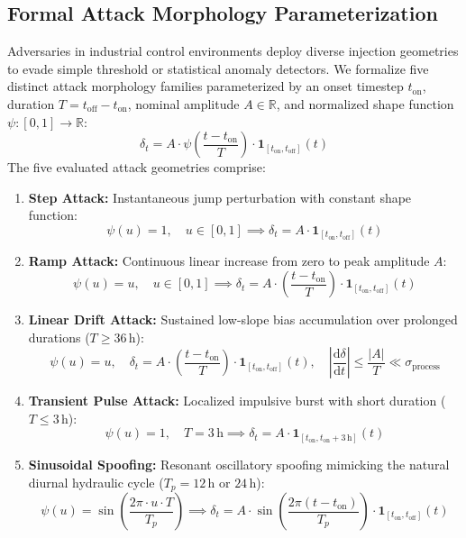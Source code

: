 \documentclass[11pt,a4paper]{article}
\begin{document}
\subsection{Formal Attack Morphology Parameterization}
Adversaries in industrial control environments deploy diverse injection geometries to evade simple threshold or statistical anomaly detectors. We formalize five distinct attack morphology families parameterized by an onset timestep $t_{\text{on}}$, duration $T = t_{\text{off}} - t_{\text{on}}$, nominal amplitude $A \in \mathbb{R}$, and normalized shape function $\psi: [0, 1] \to \mathbb{R}$:
\begin{equation}
\delta_t = A \cdot \psi\left(\frac{t - t_{\text{on}}}{T}\right) \cdot \mathbf{1}_{[t_{\text{on}}, t_{\text{off}}]}(t)
\end{equation}
The five evaluated attack geometries comprise:
\begin{enumerate}
    \item \textbf{Step Attack:} Instantaneous jump perturbation with constant shape function:
    \begin{equation}
    \psi(u) = 1, \quad u \in [0, 1] \implies \delta_t = A \cdot \mathbf{1}_{[t_{\text{on}}, t_{\text{off}}]}(t)
    \end{equation}
    \item \textbf{Ramp Attack:} Continuous linear increase from zero to peak amplitude $A$:
    \begin{equation}
    \psi(u) = u, \quad u \in [0, 1] \implies \delta_t = A \cdot \left(\frac{t - t_{\text{on}}}{T}\right) \cdot \mathbf{1}_{[t_{\text{on}}, t_{\text{off}}]}(t)
    \end{equation}
    \item \textbf{Linear Drift Attack:} Sustained low-slope bias accumulation over prolonged durations ($T \ge 36$\,h):
    \begin{equation}
    \psi(u) = u, \quad \delta_t = A \cdot \left(\frac{t - t_{\text{on}}}{T}\right) \cdot \mathbf{1}_{[t_{\text{on}}, t_{\text{off}}]}(t), \quad \left|\frac{\mathrm{d}\delta}{\mathrm{d}t}\right| \le \frac{|A|}{T} \ll \sigma_{\text{process}}
    \end{equation}
    \item \textbf{Transient Pulse Attack:} Localized impulsive burst with short duration ($T \le 3$\,h):
    \begin{equation}
    \psi(u) = 1, \quad T = 3\,\text{h} \implies \delta_t = A \cdot \mathbf{1}_{[t_{\text{on}}, t_{\text{on}}+3\,\text{h}]}(t)
    \end{equation}
    \item \textbf{Sinusoidal Spoofing:} Resonant oscillatory spoofing mimicking the natural diurnal hydraulic cycle ($T_p = 12$\,h or $24$\,h):
    \begin{equation}
    \psi(u) = \sin\left(\frac{2\pi \cdot u \cdot T}{T_p}\right) \implies \delta_t = A \cdot \sin\left(\frac{2\pi(t - t_{\text{on}})}{T_p}\right) \cdot \mathbf{1}_{[t_{\text{on}}, t_{\text{off}}]}(t)
    \end{equation}
\end{enumerate}
\end{document}
